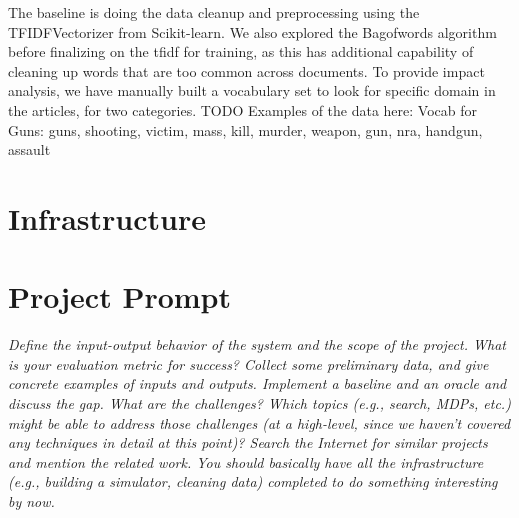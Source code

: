 \documentclass{article}
\begin{document}
The baseline is doing the data cleanup and preprocessing using the TFIDFVectorizer from Scikit-learn.
We also explored the Bagofwords algorithm before finalizing on the tfidf for training, as this has additional capability of cleaning up words that are too common across documents.
To provide impact analysis, we have manually built a vocabulary set to look for specific domain in the articles, for two categories.
TODO Examples of the data here:
Vocab for Guns:
guns, shooting, victim, mass, kill, murder, weapon, gun, nra, handgun, assault


\maketitle %


\section*{Infrastructure} %

\section*{Project Prompt}

\textit{Define the input-output behavior of the system and the scope of the project. What is your evaluation metric for success? Collect some preliminary data, and give concrete examples of inputs and outputs. Implement a baseline and an oracle and discuss the gap. What are the challenges? Which topics (e.g., search, MDPs, etc.) might be able to address those challenges (at a high-level, since we haven't covered any techniques in detail at this point)? Search the Internet for similar projects and mention the related work. You should basically have all the infrastructure (e.g., building a simulator, cleaning data) completed to do something interesting by now.}
\end{document}
